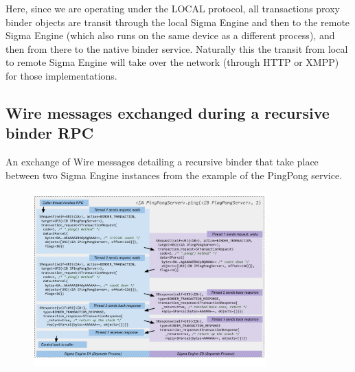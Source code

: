 \documentclass[prodmode]{acmlarge}
\begin{document}
Here, since we are operating under the LOCAL protocol, all transactions proxy binder objects are transit through the local Sigma Engine and then to the remote Sigma Engine (which also runs on the same device as a different process), and then from there to the native binder service. Naturally this the transit from local to remote Sigma Engine will take over the network (through HTTP or XMPP) for those implementations.

\pagebreak[4]
\subsection{Wire messages exchanged during a recursive binder RPC}
\label{app:WireExchangeRecursive}
An exchange of Wire messages detailing a recursive binder that take place between two Sigma Engine instances from the example of the PingPong service.
\begin{figure}[h!]
\centering
\includegraphics[width=0.8\textwidth]{drawings/WireExchangeRecursive.pdf}
\end{figure}
\pagebreak[4]

\begingroup
\raggedright
\footnotesize

\endgroup
\end{document}
